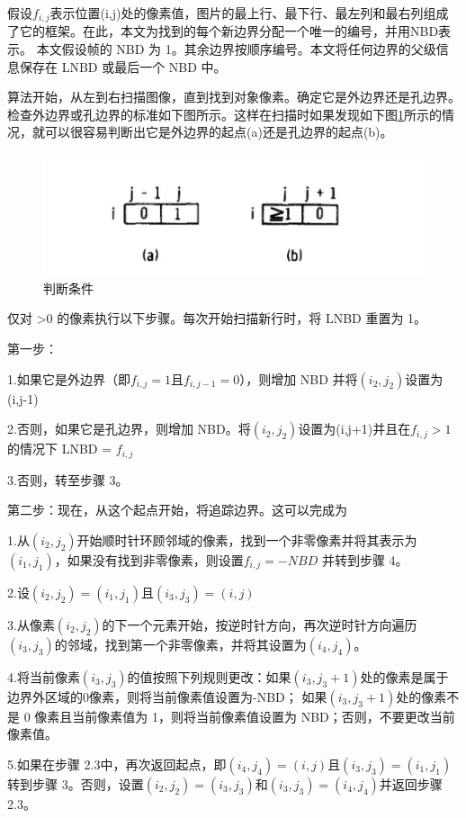 假设$f_{i,j}$表示位置(i,j)处的像素值，图片的最上行、最下行、最左列和最右列组成了它的框架。在此，本文为找到的每个新边界分配一个唯一的编号，并用NBD表示。
本文假设帧的 NBD 为 1。其余边界按顺序编号。本文将任何边界的父级信息保存在 LNBD 或最后一个 NBD 中。

算法开始，从左到右扫描图像，直到找到对象像素。确定它是外边界还是孔边界。检查外边界或孔边界的标准如下图所示。这样在扫描时如果发现如下图\ref{18}所示的情况，就可以很容易判断出它是外边界的起点(a)还是孔边界的起点(b)。
\begin{figure}[ht]
    \centering
    \includegraphics[width=\textwidth]{figures/algorithm_condition.png}
    \caption{判断条件}
    \label{18}
\end{figure}


仅对 >0 的像素执行以下步骤。每次开始扫描新行时，将 LNBD 重置为 1。

第一步：

1.如果它是外边界（即$f_{i,j}=1$且$f_{i,j-1}=0$），则增加 NBD 并将$(i_2,j_2)$设置为(i,j-1)

2.否则，如果它是孔边界，则增加 NBD。将$(i_2,j_2)$设置为(i,j+1)并且在$f_{i,j}>1$的情况下 LNBD = $f_{i,j}$

3.否则，转至步骤 3。

第二步：现在，从这个起点开始，将追踪边界。这可以完成为

1.从$(i_2,j_2)$开始顺时针环顾邻域的像素，找到一个非零像素并将其表示为$(i_1,j_1)$，如果没有找到非零像素，则设置$f_{i,j}=-NBD$ 并转到步骤 4。

2.设$(i_2,j_2)=(i_1,j_1)$且$(i_3,j_3)=(i,j)$

3.从像素$(i_2,j_2)$的下一个元素开始，按逆时针方向，再次逆时针方向遍历$(i_3,j_3)$的邻域，找到第一个非零像素，并将其设置为$(i_4,j_4)$。

4.将当前像素$(i_3,j_3)$的值按照下列规则更改：如果$(i_3,j_3+1)$处的像素是属于边界外区域的0像素，则将当前像素值设置为-NBD；
如果$(i_3,j_3+1)$处的像素不是 0 像素且当前像素值为 1，则将当前像素值设置为 NBD；否则，不要更改当前像素值。

5.如果在步骤 2.3中，再次返回起点，即$(i_4,j_4)=(i,j)$且$(i_3,j_3)=(i_1,j_1)$转到步骤 3。否则，设置$(i_2,j_2)=(i_3,j_3)$和$(i_3,j_3)=(i_4,j_4)$并返回步骤 2.3。

